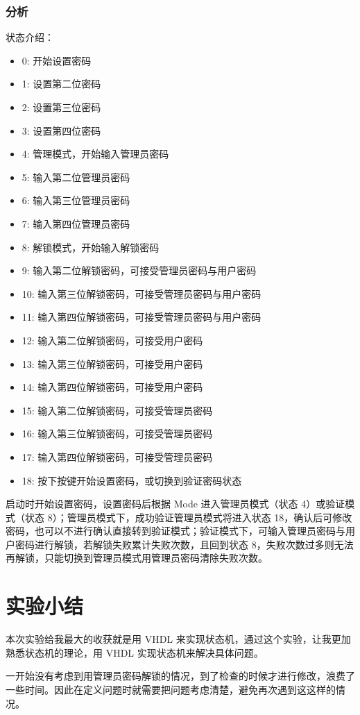 \documentclass[a4paper]{article}
\begin{document}
    \subsubsection{分析}
        \par 状态介绍：
        \begin{itemize}
            \item 0: 开始设置密码
            \item 1: 设置第二位密码
            \item 2: 设置第三位密码
            \item 3: 设置第四位密码
            \item 4: 管理模式，开始输入管理员密码
            \item 5: 输入第二位管理员密码
            \item 6: 输入第三位管理员密码
            \item 7: 输入第四位管理员密码
            \item 8: 解锁模式，开始输入解锁密码
            \item 9: 输入第二位解锁密码，可接受管理员密码与用户密码
            \item 10: 输入第三位解锁密码，可接受管理员密码与用户密码
            \item 11: 输入第四位解锁密码，可接受管理员密码与用户密码
            \item 12: 输入第二位解锁密码，可接受用户密码
            \item 13: 输入第三位解锁密码，可接受用户密码
            \item 14: 输入第四位解锁密码，可接受用户密码
            \item 15: 输入第二位解锁密码，可接受管理员密码
            \item 16: 输入第三位解锁密码，可接受管理员密码
            \item 17: 输入第四位解锁密码，可接受管理员密码
            \item 18: 按下按键开始设置密码，或切换到验证密码状态
        \end{itemize}

        \par 启动时开始设置密码，设置密码后根据 Mode 进入管理员模式（状态 4）或验证模式（状态 8）；管理员模式下，成功验证管理员模式将进入状态 18，确认后可修改密码，也可以不进行确认直接转到验证模式；验证模式下，可输入管理员密码与用户密码进行解锁，若解锁失败累计失败次数，且回到状态 8，失败次数过多则无法再解锁，只能切换到管理员模式用管理员密码清除失败次数。

\section{实验小结}

    \par 本次实验给我最大的收获就是用 VHDL 来实现状态机，通过这个实验，让我更加熟悉状态机的理论，用 VHDL 实现状态机来解决具体问题。
    \par 一开始没有考虑到用管理员密码解锁的情况，到了检查的时候才进行修改，浪费了一些时间。因此在定义问题时就需要把问题考虑清楚，避免再次遇到这这样的情况。
    
\end{document}
